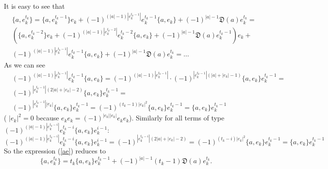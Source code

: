 \documentclass[secthm,seceqn,amsthm,ussrhead,reqno,12pt]{amsart}
\theoremstyle{plain}
\begin{document}
It is easy to see that
\begin{equation}
\label{ae}
\begin{aligned}
&\{a,e_k^{t_k}\}=
\{a,e_k^{t_k-1}\}e_k +(-1)^{(|a|-1)|e_k^{t_k-1}|}e_k^{t_k-1} \{a,e_k\} +(-1)^{|a|-1}{\mathfrak D}(a)e_k^{t_k}=\\
&\left(\{a,e_k^{t_k-2}\}e_k+(-1)^{(|a|-1)|e_k^{t_k-2}|}e_k^{t_k-2} \{a,e_k\}+ (-1)^{|a|-1}{\mathfrak D}(a)e_k^{t_k-1}\right)e_k+\\
& (-1)^{(|a|-1)|e_k^{t_k-1}|}e_k^{t_k-1}\{a,e_k\} +(-1)^{|a|-1}{\mathfrak D}(a)e_k^{t_k}=\dots
\end{aligned}
\end{equation}
As we can see 
\begin{equation*}
\begin{aligned}
&(-1)^{(|a|-1)|e_k^{t_k-1}|}e_k^{t_k-1} \{a,e_k\}=(-1)^{(|a|-1)|e_k^{t_k-1}|}\cdot (-1)^{|e_k^{t_k-1}|(|a|+|e_k|-1)}\{a,e_k\}e_k^{t_k-1}=\\ &(-1)^{|e_k^{t_k-1}|(2|a|+|e_k|-2)}\{a,e_k\}e_k^{t_k-1}=\\&(-1)^{|e_k^{t_k-1}||e_k|}\{a,e_k\}e_k^{t_k-1}=(-1)^{(t_k-1)|e_k|^2}\{a,e_k\}e_k^{t_k-1}=\{a,e_k\}e_k^{t_k-1} 
\end{aligned}
\end{equation*}
( $|e_k|^2=0$ because $e_k e_k = (-1)^{|e_k||e_k|} e_k e_k$). Similarly for all terms of type $(-1)^{(|a|-1)|e_k^{t_k-i}|}e_k^{t_k-i} \{a,e_k\}e_k^{i-1}$:
$$(-1)^{(|a|-1)|e_k^{t_k-i}|}e_k^{t_k-i} \{a,e_k\}e_k^{i-1}=(-1)^{|e_k^{t_k-i}|(2|a|+|e_k|-2)}=(-1)^{(t_k -i)|e_k|^2}\{a,e_k\}e_k^{t_k-1}=\{a,e_k\}e_k^{t_k-1}$$
So the expression (\ref{ae}) reduces to
\begin{equation}
\label{aec}
\{a, e_k^{t_k} \}=t_k \{a,e_k\} e_k^{t_k-1}+(-1)^{|a|-1}(t_k-1){\mathfrak D}(a)e_k^{t_k}. 
\end{equation}
\end{document}
